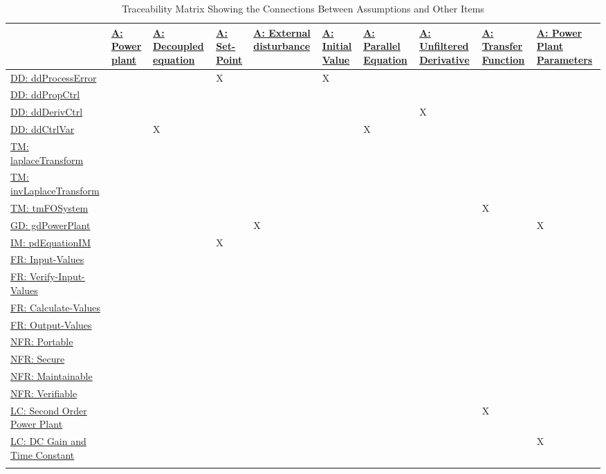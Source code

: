\documentclass[12pt]{article}
\begin{document}
\begin{longtable}{l l l l l l l l l l}
\toprule
\textbf{} & \textbf{\hyperref[pwrPlant]{A: Power plant}} & \textbf{\hyperref[decoupled]{A: Decoupled equation}} & \textbf{\hyperref[setPoint]{A: Set-Point}} & \textbf{\hyperref[externalDistub]{A: External disturbance}} & \textbf{\hyperref[initialValue]{A: Initial Value}} & \textbf{\hyperref[parallelEq]{A: Parallel Equation}} & \textbf{\hyperref[unfilteredDerivative]{A: Unfiltered Derivative}} & \textbf{\hyperref[pwrPlantTxFnx]{A: Transfer Function}} & \textbf{\hyperref[dcGainTimeConst]{A: Power Plant Parameters}}
\\
\midrule
\endhead
\hyperref[DD:ddProcessError]{DD: ddProcessError} &  &  & X &  & X &  &  &  & 
\\
\hyperref[DD:ddPropCtrl]{DD: ddPropCtrl} &  &  &  &  &  &  &  &  & 
\\
\hyperref[DD:ddDerivCtrl]{DD: ddDerivCtrl} &  &  &  &  &  &  & X &  & 
\\
\hyperref[DD:ddCtrlVar]{DD: ddCtrlVar} &  & X &  &  &  & X &  &  & 
\\
\hyperref[TM:laplaceTransform]{TM: laplaceTransform} &  &  &  &  &  &  &  &  & 
\\
\hyperref[TM:invLaplaceTransform]{TM: invLaplaceTransform} &  &  &  &  &  &  &  &  & 
\\
\hyperref[TM:tmFOSystem]{TM: tmFOSystem} &  &  &  &  &  &  &  & X & 
\\
\hyperref[GD:gdPowerPlant]{GD: gdPowerPlant} &  &  &  & X &  &  &  &  & X
\\
\hyperref[IM:pdEquationIM]{IM: pdEquationIM} &  &  & X &  &  &  &  &  & 
\\
\hyperref[inputValues]{FR: Input-Values} &  &  &  &  &  &  &  &  & 
\\
\hyperref[verifyInputs]{FR: Verify-Input-Values} &  &  &  &  &  &  &  &  & 
\\
\hyperref[calculateValues]{FR: Calculate-Values} &  &  &  &  &  &  &  &  & 
\\
\hyperref[outputValues]{FR: Output-Values} &  &  &  &  &  &  &  &  & 
\\
\hyperref[portability]{NFR: Portable} &  &  &  &  &  &  &  &  & 
\\
\hyperref[security]{NFR: Secure} &  &  &  &  &  &  &  &  & 
\\
\hyperref[maintainability]{NFR: Maintainable} &  &  &  &  &  &  &  &  & 
\\
\hyperref[verifiability]{NFR: Verifiable} &  &  &  &  &  &  &  &  & 
\\
\hyperref[likeChgIC]{LC: Second Order Power Plant} &  &  &  &  &  &  &  & X & 
\\
\hyperref[likeChgPP]{LC: DC Gain and Time Constant} &  &  &  &  &  &  &  &  & X
\\
\bottomrule
\caption{Traceability Matrix Showing the Connections Between Assumptions and Other Items}
\label{Table:TraceMatAvsAll}
\end{longtable}
\end{document}
